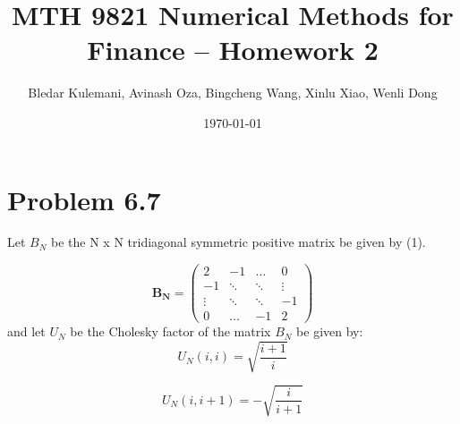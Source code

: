 \documentclass{article}
\title{MTH 9821 Numerical Methods for Finance -- Homework 2}
\author{Bledar Kulemani, Avinash Oza, Bingcheng Wang, Xinlu Xiao, Wenli Dong}
\date{\today}
\DeclareMathOperator{\1}{\mathit{1}}
\numberwithin{figure}{section} %
\numberwithin{table}{section}
\begin{document}
\maketitle

\section{Problem 6.7} 
Let \(B_N\) be the N x N  tridiagonal symmetric positive matrix be given by (1). 

\begin{equation}
	\mathbf{B_N} = \left(
	\begin{array}{cccc}
	2 & -1 & \ldots & 0\\
	-1 & \ddots & \ddots & \vdots \\
	\vdots & \ddots & \ddots & -1 \\
	0 & \ldots & -1 & 2
	\end{array} \right)
\end{equation}
and let \(U_N\) be the Cholesky factor  of the matrix \(B_N\) be given by:
\begin{equation}
	U_N(i,i) = \sqrt{\frac{i+1}{i}}
\end{equation}

\begin{equation}
	U_N(i,i+1) = -\sqrt{\frac{i}{i+1}}
\end{equation}
\end{document}
